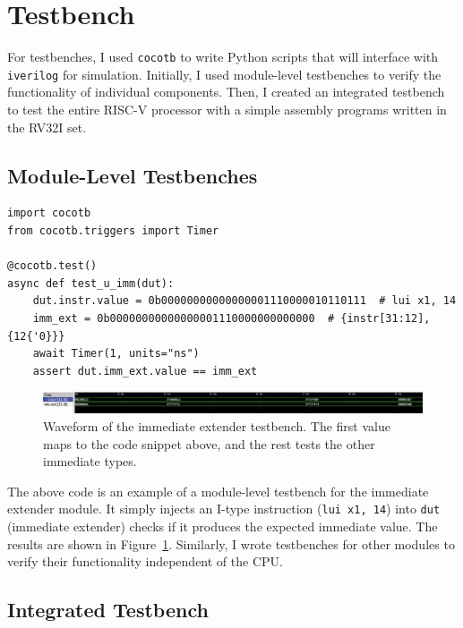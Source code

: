 \section{Testbench}

For testbenches, I used \texttt{cocotb} to write Python scripts that will interface with \texttt{iverilog} for simulation.
Initially, I used module-level testbenches to verify the functionality of individual components.
Then, I created an integrated testbench to test the entire RISC-V processor with a simple assembly programs written in the RV32I set.

\subsection{Module-Level Testbenches}

\begin{verbatim}
import cocotb
from cocotb.triggers import Timer

@cocotb.test()
async def test_u_imm(dut):
    dut.instr.value = 0b00000000000000001110000010110111  # lui x1, 14
    imm_ext = 0b00000000000000001110000000000000  # {instr[31:12], {12{'0}}}
    await Timer(1, units="ns")
    assert dut.imm_ext.value == imm_ext
\end{verbatim}

\begin{figure}[H]
    \centering
    \includegraphics[width=\textwidth]{media/imm_ext_waveform}
    \caption{Waveform of the immediate extender testbench. The first value maps to the code snippet above, and the rest tests the other immediate types.}
    \label{fig:imm-extender}
\end{figure}

The above code is an example of a module-level testbench for the immediate extender module.
It simply injects an I-type instruction (\texttt{lui x1, 14}) into \texttt{dut} (immediate extender) checks if it produces the expected immediate value.
The results are shown in Figure~\ref{fig:imm-extender}.
Similarly, I wrote testbenches for other modules to verify their functionality independent of the CPU.

\subsection{Integrated Testbench}

